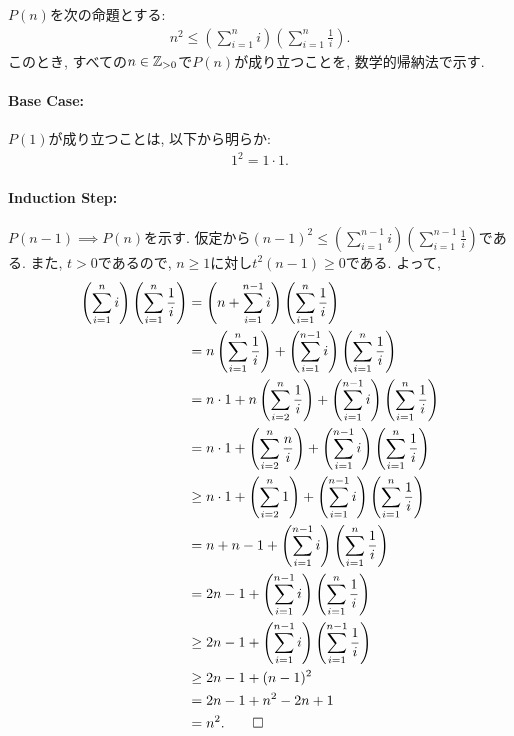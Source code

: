 \begin{proof*}
  $P(n)$を次の命題とする:
  \begin{align*}
    n^2\leq \left(\sum_{i=1}^{n}i\right)\left(\sum_{i=1}^{n}\frac{1}{i}\right)
    .
  \end{align*}
  このとき,
  すべての$n\in\mathbb{Z}_{>0}$で$P(n)$が成り立つことを,
  数学的帰納法で示す.

  \paragraph{Base Case:}
  $P(1)$が成り立つことは, 以下から明らか:
  \begin{align*}
    1^2=1\cdot 1.
  \end{align*}
  \paragraph{Induction Step:}
  $P(n-1)\implies P(n)$を示す.
  仮定から$(n-1)^2\leq \left(\sum_{i=1}^{n-1}i\right)\left(\sum_{i=1}^{n-1}\frac{1}{i}\right)$である.
  また, $t>0$であるので, 
  $n\geq 1$に対し$t^2(n-1)\geq 0$である.
  よって,
  \begin{align*}
    \left(\sum_{i=1}^{n}i\right)\left(\sum_{i=1}^{n}\frac{1}{i}\right)
    &=\left(n+\sum_{i=1}^{n-1}i\right)\left(\sum_{i=1}^{n}\frac{1}{i}\right)\\
    &=n\left(\sum_{i=1}^{n}\frac{1}{i}\right)+\left(\sum_{i=1}^{n-1}i\right)\left(\sum_{i=1}^{n}\frac{1}{i}\right)\\
    &=
    n\cdot1+n\left(\sum_{i=2}^{n}\frac{1}{i}\right)+
    \left(\sum_{i=1}^{n-1}i\right)\left(\sum_{i=1}^{n}\frac{1}{i}\right)\\
    &=
    n\cdot1+\left(\sum_{i=2}^{n}\frac{n}{i}\right)
    +\left(\sum_{i=1}^{n-1}i\right)\left(\sum_{i=1}^{n}\frac{1}{i}\right)
    \\
    &\geq
    n\cdot1+\left(\sum_{i=2}^{n}1\right)+
    \left(\sum_{i=1}^{n-1}i\right)\left(\sum_{i=1}^{n}\frac{1}{i}\right)\\
    &=
    n+n-1+
    \left(\sum_{i=1}^{n-1}i\right)\left(\sum_{i=1}^{n}\frac{1}{i}\right)\\
    &=
    2n-1+
    \left(\sum_{i=1}^{n-1}i\right)\left(\sum_{i=1}^{n}\frac{1}{i}\right)\\
    &\geq
    2n-1+
    \left(\sum_{i=1}^{n-1}i\right)\left(\sum_{i=1}^{n-1}\frac{1}{i}\right)\\
    &\geq
    2n-1+(n-1)^2\\
    &=2n-1+n^2-2n+1\\
    &=n^2
    .\qedhere
  \end{align*}
\end{proof*}


